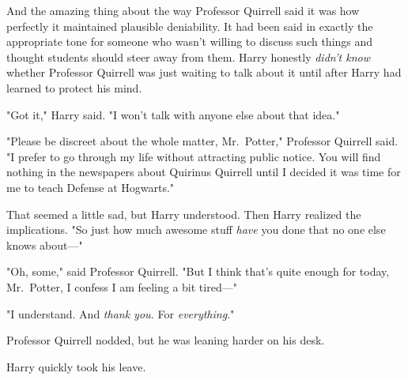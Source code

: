And the amazing thing about the way Professor Quirrell said it was how
perfectly it maintained plausible deniability. It had been said in exactly the
appropriate tone for someone who wasn't willing to discuss such things and
thought students should steer away from them. Harry honestly \emph{didn't know}
whether Professor Quirrell was just waiting to talk about it until after Harry
had learned to protect his mind.

"Got it," Harry said. "I won't talk with anyone else about that idea."

"Please be discreet about the whole matter, Mr.~Potter," Professor Quirrell
said. "I prefer to go through my life without attracting public notice. You
will find nothing in the newspapers about Quirinus Quirrell until I decided it
was time for me to teach Defense at Hogwarts."

That seemed a little sad, but Harry understood. Then Harry realized the
implications. "So just how much awesome stuff \emph{have} you done that no one
else knows about—"

"Oh, some," said Professor Quirrell. "But I think that's quite enough for
today, Mr.~Potter, I confess I am feeling a bit tired—"

"I understand. And \emph{thank you.} For \emph{everything}."

Professor Quirrell nodded, but he was leaning harder on his desk.

Harry quickly took his leave.
